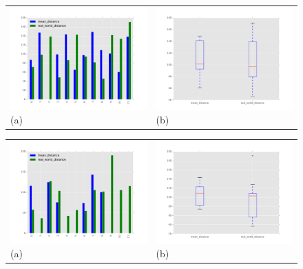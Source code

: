 \begin{figure}[h]
	\centering
	\begin{tabular}{m{7.0cm} m{7.0cm}}
	\includegraphics[width=7cm]{img/evaluation/medium_bar}
	\centering \small (a)
	&
	\includegraphics[width=7cm]{img/evaluation/medium_box}
	\centering \small (b)
	\end{tabular}
    \caption{}
    \label{fig:eval_medium}
\end{figure}

\begin{figure}[h]
	\centering
	\begin{tabular}{m{7.0cm} m{7.0cm}}
	\includegraphics[width=7cm]{img/evaluation/tiny_bar}
	\centering \small (a)
	&
	\includegraphics[width=7cm]{img/evaluation/tiny_box}
	\centering \small (b)
	\end{tabular}
    \caption{}
    \label{fig:eval_tiny}
\end{figure}


